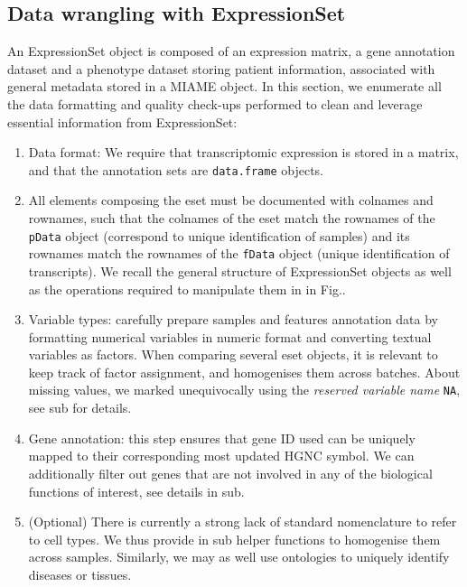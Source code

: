 \subsection{Data wrangling with ExpressionSet}\label{data-wrangling-with-expressionset}

An ExpressionSet object is composed of an expression matrix, a gene annotation dataset
and a phenotype dataset storing patient information, associated with general metadata stored in a MIAME object. In this section, we enumerate all the data formatting and quality check-ups performed to clean and leverage essential information from ExpressionSet:

\begin{enumerate}
\def\labelenumi{\arabic{enumi}.}
\item
  Data format: We require that transcriptomic expression is stored in a matrix, and that the annotation sets are \texttt{data.frame} objects.
\item
  All elements composing the eset must be documented with colnames and rownames, such that the colnames of the eset match the rownames of the \texttt{pData} object (correspond to unique identification of samples) and its rownames match the rownames of the \texttt{fData} object (unique identification of transcripts). We recall the general structure of ExpressionSet objects as well as the operations required to manipulate them in in Fig..
\item
  Variable types: carefully prepare samples and features annotation data by formatting numerical variables in numeric format and converting textual variables as factors. When comparing several eset objects, it is relevant to keep track of factor assignment, and homogenises them across batches. About missing values, we marked unequivocally using the \emph{reserved variable name} \texttt{NA}, see sub for details.
\item
  Gene annotation: this step ensures that gene ID used can be uniquely mapped to their corresponding most updated HGNC symbol. We can additionally filter out genes that are not involved in any of the biological functions of interest, see details in sub.
\item
  (Optional) There is currently a strong lack of standard nomenclature to refer to cell types. We thus provide in sub helper functions to homogenise them across samples. Similarly, we may as well use ontologies to uniquely identify diseases or tissues.
\end{enumerate}





